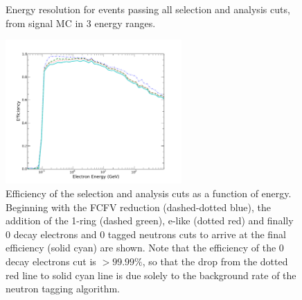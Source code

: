 \begin{figure}
	\centering
\caption{Energy resolution for events passing all selection and analysis cuts, from signal MC in 3 energy ranges.} 
\label{fig:energy_res}
\end{figure}  

\begin{figure}
	\includegraphics[width=0.6\textwidth]{figures/efficiency_30MeV_1TeV.pdf}
	\caption{Efficiency of the selection and analysis cuts as a function of energy.  Beginning with the FCFV reduction (dashed-dotted blue), the addition of the 1-ring (dashed green), e-like (dotted red) and finally 0 decay electrons and 0 tagged neutrons cuts to arrive at the final efficiency (solid cyan) are shown.  Note that the efficiency of the 0 decay electrons cut is $>99.99\%$, so that the drop from the dotted red line to solid cyan line is due solely to the background rate of the neutron tagging algorithm.}
	\label{fig:eff}
\end{figure}



 